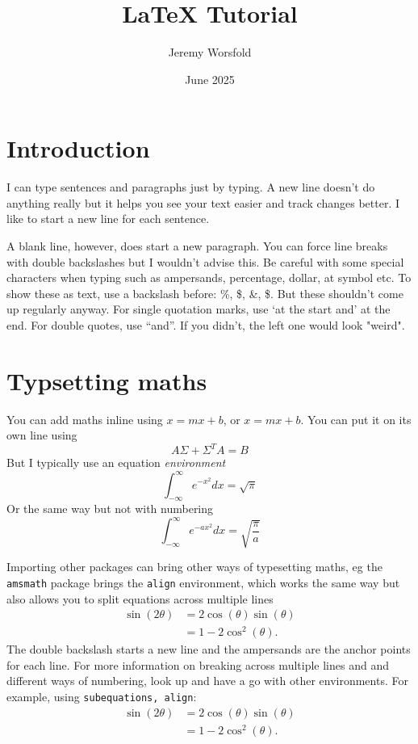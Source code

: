 \documentclass[11pt, a4paper, twocolumn]{article}
\title{LaTeX Tutorial}
\author{Jeremy Worsfold}
\date{June 2025}
\begin{document}
\maketitle

\section{Introduction}

I can type sentences and paragraphs just by typing.
A new line doesn't do anything really but it helps you see your text easier and track changes better.
I like to start a new line for each sentence.

A blank line, however, does start a new paragraph. You can force line breaks with double backslashes but I wouldn't advise this. 
Be careful with some special characters when typing such as ampersands, percentage, dollar, at symbol etc. To show these as text, use a backslash before: \%, \$, \&, \$. But these shouldn't come up regularly anyway.
For single quotation marks, use `at the start and' at the end. For double quotes, use ``and''. 
If you didn't, the left one would look "weird".


\section{Typsetting maths}

You can add maths inline using $x=mx + b$, or \(x=mx+b\). You can put it on its own line using 
\[
    A\Sigma + \Sigma^T A = B
\]
But I typically use an equation \textit{environment}
\begin{equation}
    \int_{-\infty}^\infty e^{-x^2} d x = \sqrt{\pi}
\end{equation}
Or the same way but not with numbering
\begin{equation*}
    \int_{-\infty}^\infty e^{-ax^2} d x = \sqrt{\frac{\pi}{a}}
\end{equation*}

Importing other packages can bring other ways of typesetting maths, eg the \texttt{amsmath} package brings the \texttt{align} environment, which works the same way but also allows you to split equations across multiple lines
\begin{align}
    \sin(2\theta) & = 2\cos(\theta)\sin(\theta) \\
    & = 1-2\cos^2(\theta).
\end{align}
The double backslash starts a new line and the ampersands are the anchor points for each line.
For more information on breaking across multiple lines and and different ways of numbering, look up and have a go with other environments.
For example, using \texttt{subequations, align}:
\begin{subequations} %
\begin{align} %
    \sin(2\theta) & = 2\cos(\theta)\sin(\theta) \\
    & = 1-2\cos^2(\theta).
\end{align}
\end{subequations}
\end{document}
